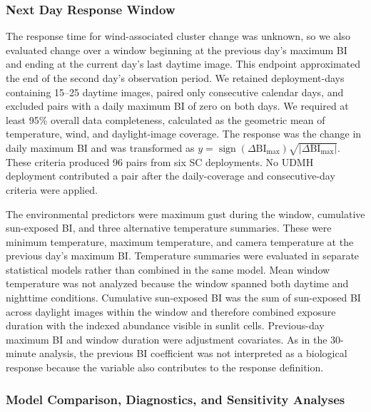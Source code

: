 \documentclass[insects,article,submit,pdftex,moreauthors]{Definitions/mdpi}
\begin{document}
\subsubsection{Next Day Response Window}

The response time for wind-associated cluster change was unknown, so we also evaluated change over a window beginning at the previous day's maximum BI and ending at the current day's last daytime image. This endpoint approximated the end of the second day's observation period. We retained deployment-days containing 15--25 daytime images, paired only consecutive calendar days, and excluded pairs with a daily maximum BI of zero on both days. We required at least 95\% overall data completeness, calculated as the geometric mean of temperature, wind, and daylight-image coverage. The response was the change in daily maximum BI and was transformed as $y=\operatorname{sign}(\Delta\mathrm{BI}_{\max})\sqrt{|\Delta\mathrm{BI}_{\max}|}$. These criteria produced 96 pairs from six SC deployments. No UDMH deployment contributed a pair after the daily-coverage and consecutive-day criteria were applied.

The environmental predictors were maximum gust during the window, cumulative sun-exposed BI, and three alternative temperature summaries. These were minimum temperature, maximum temperature, and camera temperature at the previous day's maximum BI. Temperature summaries were evaluated in separate statistical models rather than combined in the same model. Mean window temperature was not analyzed because the window spanned both daytime and nighttime conditions. Cumulative sun-exposed BI was the sum of sun-exposed BI across daylight images within the window and therefore combined exposure duration with the indexed abundance visible in sunlit cells. Previous-day maximum BI and window duration were adjustment covariates. As in the 30-minute analysis, the previous BI coefficient was not interpreted as a biological response because the variable also contributes to the response definition.

\subsubsection{Model Comparison, Diagnostics, and Sensitivity Analyses}
\end{document}
